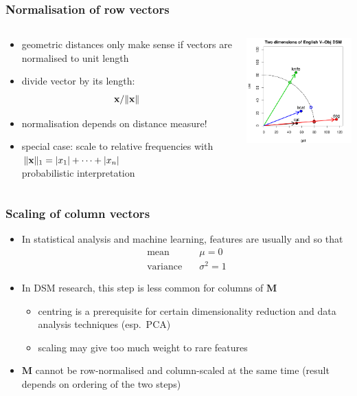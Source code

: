 \begin{frame}[c]
  \frametitle{Normalisation of row vectors}
  
  \begin{columns}[c]
    \begin{column}{5cm}
      \begin{itemize}
      \item geometric distances only make sense if vectors are normalised to unit length
      \item divide vector by its length: \[ \vx / \norm{\vx} \]
      \item normalisation depends on distance measure!
      \item special case: scale to relative frequencies with
        $\norm[1]{\vx} = \abs{x_1} + \dots + \abs{x_n}$\\
        \so probabilistic interpretation
      \end{itemize}
    \end{column}
    \begin{column}{6cm}
      \includegraphics[width=6cm]{img/hieroglyph_2d_4}
    \end{column}
  \end{columns}
\end{frame}

\begin{frame}
  \frametitle{Scaling of column vectors}

  \begin{itemize}
  \item In statistical analysis and machine learning, features are
    usually  and  so that
    \begin{align*}
      \text{mean} & \quad \mu = 0 \\
      \text{variance} & \quad \sigma^2 = 1
    \end{align*}
  \item In DSM research, this step is less common for columns of $\mathbf{M}$
    \begin{itemize}
    \item centring is a prerequisite for certain dimensionality
      reduction and data analysis techniques (esp.\ PCA)
    \item scaling may give too much weight to rare features
    \end{itemize}
    \pause
  \item $\mathbf{M}$ cannot be row-normalised and column-scaled at the
    same time (result depends on ordering of the two steps)
  \end{itemize}
\end{frame}

